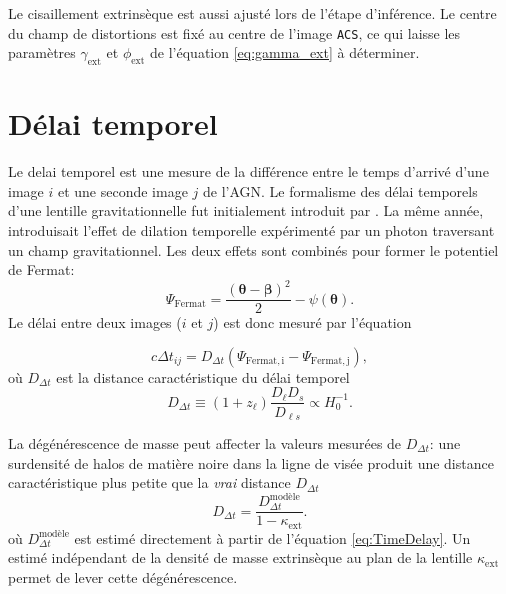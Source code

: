 \documentclass[times,10pt,twocolumn]{article}
\begin{document}
Le cisaillement extrinsèque est aussi ajusté lors de l'étape d'inférence. Le centre 
du champ de distortions est fixé au centre de l'image \texttt{ACS}, ce qui laisse 
les paramètres $\gamma_{\mathrm{ext}}$ et $\phi_{\mathrm{ext}}$ de l'équation 
\eqref{eq:gamma_ext} à déterminer.



\section{Délai temporel}\label{sec:delay}
Le delai temporel est une mesure de la différence entre le temps d'arrivé d'une image $i$ 
et une seconde image $j$ de l'AGN. Le formalisme des délai temporels d'une 
lentille gravitationnelle fut initialement introduit par \citet{Refsdal1964}. La même 
année, \citet{Shapiro1964} introduisait l'effet de dilation temporelle expérimenté par 
un photon traversant un champ gravitationnel. Les deux effets sont combinés pour 
former le potentiel de Fermat:
\begin{equation}\label{eq:PotentielFermat} 
        \Psi_{\mathrm{Fermat}} = \frac{(\boldsymbol{\theta} - \boldsymbol{\beta})^{2}}{2}
        - \psi(\boldsymbol{\theta}).
\end{equation} 
Le délai entre deux images ($i$ et $j$) est donc mesuré par l'équation

\begin{equation}\label{eq:TimeDelay} 
        c \Delta t_{ij} = D_{\Delta t} \left( \Psi_{\mathrm{Fermat, i}} - 
        \Psi_{\mathrm{Fermat, j}} \right),
\end{equation} 
où $D_{\Delta t}$ est la distance caractéristique du délai temporel
\begin{equation}\label{eq:Ddt} 
        D_{\Delta t} \equiv (1 + z_{\ell}) \frac{D_\ell D_s}{D_{\ell s}} \propto H_0^{-1}.
\end{equation}

La dégénérescence de masse peut affecter la valeurs mesurées de $D_{\Delta t}$: 
une surdensité de halos de matière noire dans la ligne de visée produit une 
distance caractéristique plus petite que la \textit{vrai} distance $D_{\Delta t}$
\begin{equation}\label{eq:Degenerescence} 
        D_{\Delta t} = \frac{D_{\Delta t}^{\text{modèle}}}{1 - \kappa_{\mathrm{ext}}}.
\end{equation} 
où $D_{\Delta t}^{\text{modèle}}$ est estimé directement à partir de l'équation 
\eqref{eq:TimeDelay}. Un estimé indépendant de la densité de 
masse extrinsèque au plan 
de la lentille $\kappa_{\mathrm{ext}}$ 
permet de lever cette dégénérescence.
\end{document}
